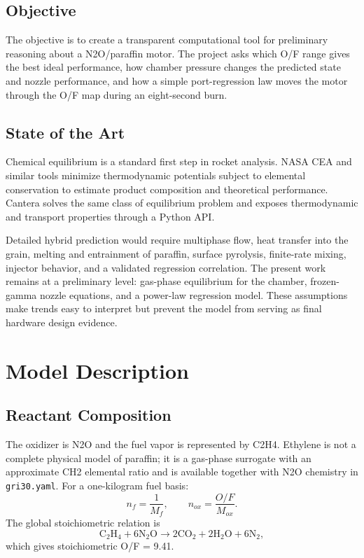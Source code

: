\documentclass[10pt,a4paper]{article}
\begin{document}
\subsection{Objective}
The objective is to create a transparent computational tool for preliminary reasoning about a N2O/paraffin motor. The project asks which O/F range gives the best ideal performance, how chamber pressure changes the predicted state and nozzle performance, and how a simple port-regression law moves the motor through the O/F map during an eight-second burn.

\subsection{State of the Art}
Chemical equilibrium is a standard first step in rocket analysis. NASA CEA and similar tools minimize thermodynamic potentials subject to elemental conservation to estimate product composition and theoretical performance. Cantera solves the same class of equilibrium problem and exposes thermodynamic and transport properties through a Python API.

Detailed hybrid prediction would require multiphase flow, heat transfer into the grain, melting and entrainment of paraffin, surface pyrolysis, finite-rate mixing, injector behavior, and a validated regression correlation. The present work remains at a preliminary level: gas-phase equilibrium for the chamber, frozen-gamma nozzle equations, and a power-law regression model. These assumptions make trends easy to interpret but prevent the model from serving as final hardware design evidence.
\newpage

\section{Model Description}
\subsection{Reactant Composition}
The oxidizer is N2O and the fuel vapor is represented by C2H4. Ethylene is not a complete physical model of paraffin; it is a gas-phase surrogate with an approximate CH2 elemental ratio and is available together with N2O chemistry in \texttt{gri30.yaml}. For a one-kilogram fuel basis:
\[
n_f = \frac{1}{M_f}, \qquad n_{ox} = \frac{O/F}{M_{ox}}.
\]
The global stoichiometric relation is
\[
\mathrm{C_2H_4 + 6N_2O \rightarrow 2CO_2 + 2H_2O + 6N_2},
\]
which gives stoichiometric O/F = 9.41.
\end{document}

